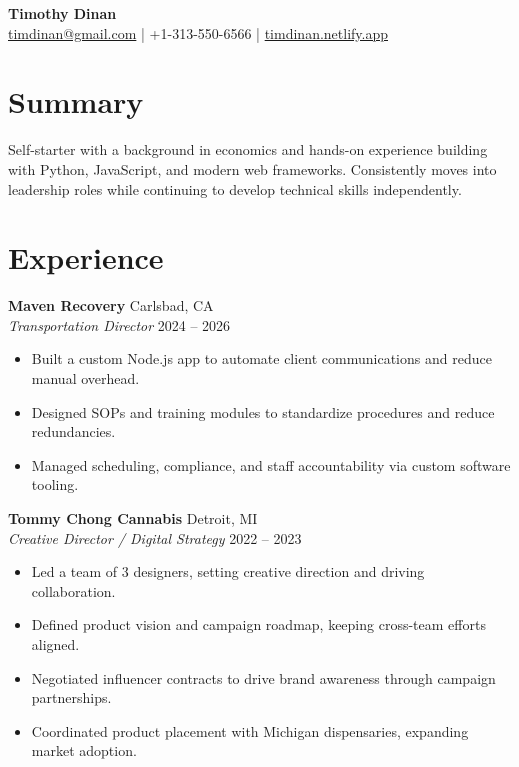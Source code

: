 \documentclass[10pt, letterpaper]{article}
\begin{document}
\begin{center}
  {\LARGE \textbf{Timothy Dinan}} \\[4pt]
  \href{mailto:timdinan@gmail.com}{timdinan@gmail.com} \quad|\quad
  +1-313-550-6566 \quad|\quad
  \href{https://timdinan.netlify.app}{timdinan.netlify.app}
\end{center}

\section{Summary}
Self-starter with a background in economics and hands-on experience building
with Python, JavaScript, and modern web frameworks. Consistently moves into
leadership roles while continuing to develop technical skills independently.

\section{Experience}

\noindent\textbf{Maven Recovery} \hfill Carlsbad, CA \\
\textit{Transportation Director} \hfill 2024 -- 2026
\begin{itemize}
  \item Built a custom Node.js app to automate client communications and reduce manual overhead.
  \item Designed SOPs and training modules to standardize procedures and reduce redundancies.
  \item Managed scheduling, compliance, and staff accountability via custom software tooling.
\end{itemize}

\vspace{3pt}

\noindent\textbf{Tommy Chong Cannabis} \hfill Detroit, MI \\
\textit{Creative Director / Digital Strategy} \hfill 2022 -- 2023
\begin{itemize}
  \item Led a team of 3 designers, setting creative direction and driving collaboration.
  \item Defined product vision and campaign roadmap, keeping cross-team efforts aligned.
  \item Negotiated influencer contracts to drive brand awareness through campaign partnerships.
  \item Coordinated product placement with Michigan dispensaries, expanding market adoption.
\end{itemize}
\end{document}
